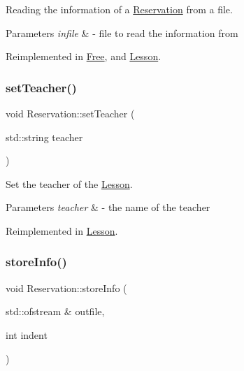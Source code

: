 Reading the information of a \mbox{\hyperlink{class_reservation}{Reservation}} from a file. 


\begin{DoxyParams}{Parameters}
{\em infile} & -\/ file to read the information from \\
\hline
\end{DoxyParams}


Reimplemented in \mbox{\hyperlink{class_free_ad1023c825c9790edf0797e2e69dd2fcf}{Free}}, and \mbox{\hyperlink{class_lesson_a3ac64e2f79bc9e381634d5d30499e8f1}{Lesson}}.

\mbox{\label{class_reservation_afa8eadd14292a52c6a404078690a7f87}} 
\subsubsection{\texorpdfstring{set\+Teacher()}{setTeacher()}}
{\footnotesize\ttfamily void Reservation\+::set\+Teacher (\begin{DoxyParamCaption}\item[{std\+::string}]{teacher }\end{DoxyParamCaption})\hspace{0.3cm}{\ttfamily [virtual]}}



Set the teacher of the \mbox{\hyperlink{class_lesson}{Lesson}}. 


\begin{DoxyParams}{Parameters}
{\em teacher} & -\/ the name of the teacher \\
\hline
\end{DoxyParams}


Reimplemented in \mbox{\hyperlink{class_lesson_acbfde853aea74c9f2a3a6d50a4812705}{Lesson}}.

\mbox{\label{class_reservation_a8ec83fe2eb15294c3a51a9998ed17df7}} 
\subsubsection{\texorpdfstring{store\+Info()}{storeInfo()}}
{\footnotesize\ttfamily void Reservation\+::store\+Info (\begin{DoxyParamCaption}\item[{std\+::ofstream \&}]{outfile,  }\item[{int}]{indent }\end{DoxyParamCaption})\hspace{0.3cm}{\ttfamily [virtual]}}



